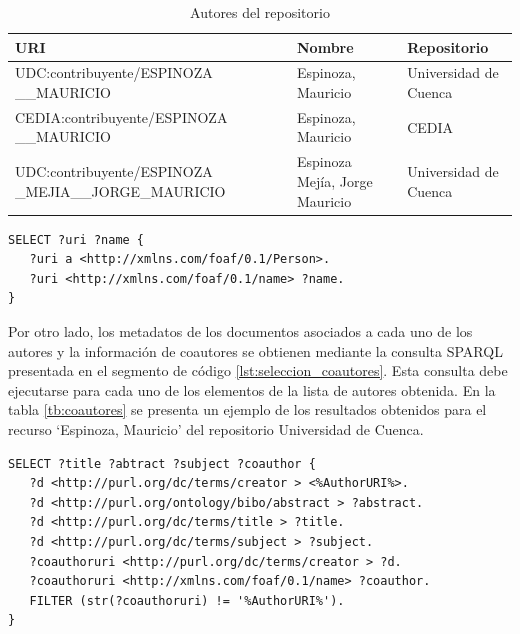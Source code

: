 \documentclass[conference]{IEEEtran}
\begin{document}
\begin{table}[]
\centering
\caption{Autores del repositorio}
\label{tb:autores}
\begin{tabular}{@{}p{}p{}p{}@{}}
\toprule
URI                                                  & Nombre                         & Repositorio           \\ \midrule
UDC:contribuyente/ESPINOZA \_\_MAURICIO               & Espinoza, Mauricio             & Universidad de Cuenca \\
CEDIA:contribuyente/ESPINOZA \_\_MAURICIO             & Espinoza, Mauricio             & CEDIA                 \\
UDC:contribuyente/ESPINOZA \_MEJIA\_\_JORGE\_MAURICIO & Espinoza Mejía, Jorge Mauricio & Universidad de Cuenca \\ \bottomrule
\end{tabular}
\end{table}

\begin{lstlisting}[language=sparql, caption={Consulta para selección de autores.}, label=lst:seleccion_autores, captionpos=b, basicstyle=\footnotesize,frame=single]  
SELECT ?uri ?name {
   ?uri a <http://xmlns.com/foaf/0.1/Person>.
   ?uri <http://xmlns.com/foaf/0.1/name> ?name.
}
\end{lstlisting}

Por otro lado, los metadatos de los documentos asociados a cada uno de los autores y la información de coautores se obtienen mediante la consulta SPARQL presentada en el segmento de código \ref{lst:seleccion_coautores}. Esta consulta debe ejecutarse para cada uno de los elementos de la lista de autores obtenida. En la tabla \ref{tb:coautores} se presenta un ejemplo de los resultados obtenidos para el recurso ‘Espinoza, Mauricio’ del repositorio Universidad de Cuenca.

\begin{lstlisting}[language=sparql, caption={Consulta para selección de coautores.}, label=lst:seleccion_coautores, captionpos=b, basicstyle=\small,frame=single,columns=flexible]  
SELECT ?title ?abtract ?subject ?coauthor {
   ?d <http://purl.org/dc/terms/creator > <%AuthorURI%>.
   ?d <http://purl.org/ontology/bibo/abstract > ?abstract.
   ?d <http://purl.org/dc/terms/title > ?title.
   ?d <http://purl.org/dc/terms/subject > ?subject.
   ?coauthoruri <http://purl.org/dc/terms/creator > ?d.
   ?coauthoruri <http://xmlns.com/foaf/0.1/name> ?coauthor.
   FILTER (str(?coauthoruri) != '%AuthorURI%').
}
\end{lstlisting}
\end{document}
